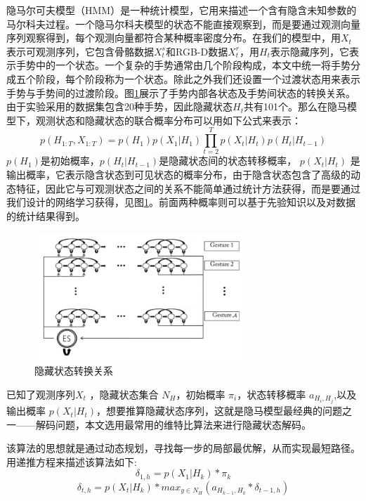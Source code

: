 \documentclass[a4paper, 12pt]{article}
\begin{document}
隐马尔可夫模型（HMM）是一种统计模型，它用来描述一个含有隐含未知参数的马尔科夫过程。一个隐马尔科夫模型的状态不能直接观察到，而是要通过观测向量序列观察得到，每个观测向量都符合某种概率密度分布。在我们的模型中，用$X_t$表示可观测序列，它包含骨骼数据$X^s_t$和RGB-D数据$X^r_t$，用$H_t$表示隐藏序列，它表示手势中的一个状态。一个复杂的手势通常由几个阶段构成，本文中统一将手势分成五个阶段，每个阶段称为一个状态。除此之外我们还设置一个过渡状态用来表示手势与手势间的过渡阶段。图\ref{fig:2}展示了手势内部各状态及手势间状态的转换关系。由于实验采用的数据集包含20种手势，因此隐藏状态$H_t$共有101个。那么在隐马模型下，观测状态和隐藏状态的联合概率分布可以用如下公式来表示：
\begin{equation}
  p(H_{1:T}, X_{1:T})= p(H_1)p(X_1|H_1)\prod_{t=2}^{T}{p(X_t|H_t)p(H_t|H_{t-1})}
\end{equation}
$p(H_1)$是初始概率，$p(H_t|H_{t-1})$是隐藏状态间的状态转移概率， $p(X_t|H_t)$ 是输出概率，它表示隐含状态到可见状态的概率分布，由于隐含状态包含了高级的动态特征，因此它与可观测状态之间的关系不能简单通过统计方法获得，而是要通过我们设计的网络学习获得，见图\ref{fig:2}。前面两种概率则可以基于先验知识以及对数据的统计结果得到。
\begin{figure}[ht]
  \centering
  \includegraphics[width=8cm]{stateDiagram.png}
  \caption{隐藏状态转换关系}
  \label{fig:2}
\end{figure}

已知了观测序列$X_t$ ，隐藏状态集合 $N_H$，初始概率 $\pi_i$，状态转移概率 $a_{H_i,H_j}$,以及输出概率 $p(X_t|H_t)$，想要推算隐藏状态序列，这就是隐马模型最经典的问题之一——解码问题，本文选用最常用的维特比算法来进行隐藏状态解码。

该算法的思想就是通过动态规划，寻找每一步的局部最优解，从而实现最短路径。
用递推方程来描述该算法如下:
\begin{equation}
  \delta_{1,h} = p(X_1|H_k)*\pi_k
\end{equation}
\begin{equation}
  \delta_{t,h}=p(X_t|H_k)*max_{y\in N_H}(a_{H_{k-1},H_k}*\delta_{t-1,h})
\end{equation}
\end{document}
